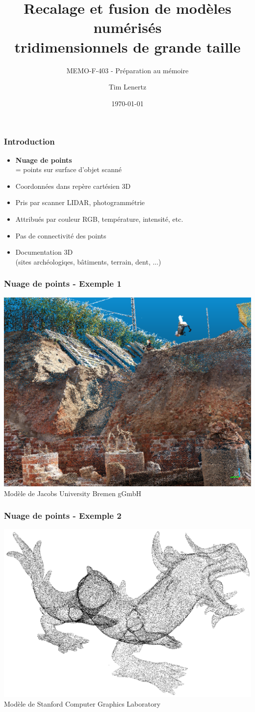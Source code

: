 \documentclass{beamer}
\title{Recalage et fusion de modèles numérisés\\tridimensionnels de grande taille}
\subtitle{MEMO-F-403 - Préparation au mémoire}
\author{Tim Lenertz}
\date{\today}
\institute{ULB}
\begin{document}
\begin{frame}
\frametitle{Introduction}
	\begin{itemize}
	\item \textbf{Nuage de points}\\
		= points sur surface d'objet scanné
	\item Coordonnées dans repère cartésien 3D 
	\item Pris par scanner LIDAR, photogrammétrie
	\item Attribués par couleur RGB, température, intensité, etc.
	\item Pas de connectivité des points
	\item Documentation 3D \\
		(sites archéologiqes, bâtiments, terrain, dent, ...)
	\end{itemize}
\end{frame}

\begin{frame}
\frametitle{Nuage de points - Exemple 1}
	\center
	\includegraphics[width=.8\textwidth]{tower_screenshot.png} \\
	\footnotesize{Modèle de Jacobs University Bremen gGmbH}
\end{frame}

\begin{frame}
\frametitle{Nuage de points - Exemple 2}
	\center
	\includegraphics[width=.9\textwidth]{dragon_screenshot.png} \\
	\footnotesize{Modèle de Stanford Computer Graphics Laboratory}
\end{frame}
\end{document}
